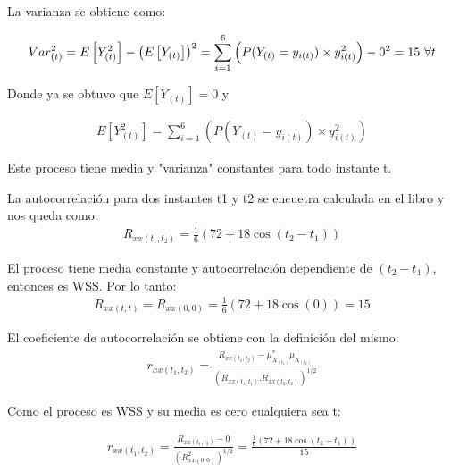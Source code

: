 La varianza se obtiene como:

\begin{equation*}
\begin{gathered}
	Var^{2}_{(t)} = E\left[Y_{(t)}^{2}\right]- \left(E\left[Y_{(t)}\right]\right)^{2}  = \sum_{i=1}^{6}\left( P(Y_{(t)} = y_{i(t)}) \times y_{i(t)}^{2}\right) - 0^2 = 15 $   $ \forall t 
\end{gathered}
\end{equation*}

Donde ya se obtuvo que $E\left[Y_{(t)}\right] = 0$ y 

\begin{equation*}
\begin{gathered}
	E\left[Y_{(t)}^{2}\right] = \sum_{i=1}^{6}\left( P(Y_{(t)} = y_{i(t)}) \times y_{i(t)}^{2}\right) 
\end{gathered}
\end{equation*}

Este proceso tiene media y "varianza" constantes para todo instante t.

La autocorrelación para dos instantes t1 y t2 se encuetra calculada en el libro y nos queda como:
\begin{equation*}
\begin{gathered}
	R_{xx(t_1,t_2)} = \frac{1}{6}\left(72+ 18 \cos(t_2 - t_1)\right)
\end{gathered}
\end{equation*}

El proceso tiene media constante y autocorrelación dependiente de $(t_2 - t_1)$, entonces es WSS. Por lo tanto:
\begin{equation*}
\begin{gathered}
	R_{xx(t,t)} = R_{xx(0,0)} = \frac{1}{6}\left(72+ 18 \cos(0)\right) = 15
\end{gathered}
\end{equation*}

El coeficiente de autocorrelación se obtiene con la definición del mismo:
\begin{equation*}
\begin{gathered}
	r_{xx(t_1,t_2)} = \frac{R_{xx(t_1,t_2)}-\mu_{X_{(t_1)}}^{*} \mu_{X_{(t_2)}}}{\left(R_{xx(t_1,t_1)}.R_{xx(t_2,t_2)}\right)^{1/2}} 
\end{gathered}
\end{equation*}

Como el proceso es WSS y su media es cero cualquiera sea t:

\begin{equation*}
\begin{gathered}
	r_{xx(t_1,t_2)} = \frac{R_{xx(t_1,t_2)}-0}{(R_{xx(0,0)}^2)^{1/2}} = \frac{\frac{1}{6}\left(72+ 18 \cos(t_2 - t_1)\right)}{15}
\end{gathered}
\end{equation*}\\


